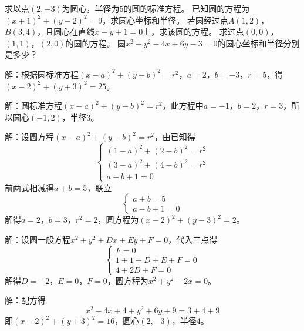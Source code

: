 \documentclass{ctexart}
\newenvironment{MyAnswer}[1][] %
 {\begin{tcolorbox}[breakable, colframe=blue] \begin{Answer}[#1] \color{blue} \kaishu}  %
 {\end{Answer}\end{tcolorbox}}
\begin{document}
\begin{Exercise}[title={圆的基本性质练习}, label={ex:circle-properties}]
    \Question 求以点$(2, -3)$为圆心，半径为$5$的圆的标准方程。
    \Question 已知圆的方程为$(x + 1)^2+(y - 2)^2 = 9$，求圆心坐标和半径。
    \Question 若圆经过点$A(1,2)$，$B(3,4)$，且圆心在直线$x - y + 1 = 0$上，求该圆的方程。
    \Question 求过点$(0,0)$，$(1,1)$，$(2,0)$的圆的方程。
    \Question 圆$x^2 + y^2 - 4x + 6y - 3 = 0$的圆心坐标和半径分别是多少？
\end{Exercise}

\begin{MyAnswer}[ref={ex:circle-properties}]
    \Question 解：根据圆标准方程$(x - a)^2+(y - b)^2 = r^2$，$a = 2$，$b=-3$，$r = 5$，得$(x - 2)^2+(y + 3)^2 = 25$。
    
    \Question 解：圆标准方程$(x - a)^2+(y - b)^2 = r^2$，此方程中$a=-1$，$b = 2$，$r = 3$，所以圆心$(-1,2)$，半径$3$。
    
    \Question 解：设圆方程$(x - a)^2+(y - b)^2 = r^2$，由已知得
    $$
    \begin{cases}
    (1 - a)^2+(2 - b)^2 = r^2 \\
    (3 - a)^2+(4 - b)^2 = r^2 \\
    a - b+1 = 0
    \end{cases}
    $$
    前两式相减得$a + b = 5$，联立
    $$
    \begin{cases}
    a + b = 5 \\
    a - b+1 = 0
    \end{cases}
    $$
    解得$a = 2$，$b = 3$，$r^2 = 2$，圆方程为$(x - 2)^2+(y - 3)^2 = 2$。
    
    \Question 解：设圆一般方程$x^{2}+y^{2}+Dx + Ey+F = 0$，代入三点得
    $$
    \begin{cases}
    F = 0 \\
    1 + 1+D + E+F = 0 \\
    4+2D+F = 0
    \end{cases}
    $$
    解得$D=-2$，$E = 0$，$F = 0$，圆方程为$x^{2}+y^{2}-2x = 0$。
    
    \Question 解：配方得
    $$
    x^{2}-4x + 4+y^{2}+6y+9=3 + 4+9
    $$
    即$(x - 2)^2+(y + 3)^2 = 16$，圆心$(2,-3)$，半径$4$。
\end{MyAnswer}
\end{document}
